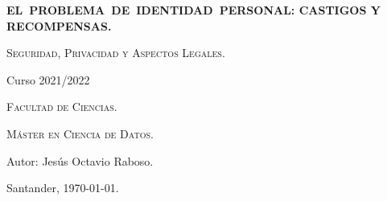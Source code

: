 \documentclass[main.tex]{subfiles}
\begin{document}
	\frontmatter
\begin{titlepage}

\centering
{\bfseries\Large \hbox{EL PROBLEMA DE IDENTIDAD PERSONAL:} CASTIGOS Y RECOMPENSAS.  \par}
\vspace{1cm}
{\scshape\large Seguridad, Privacidad y Aspectos Legales. \par}
\vspace{0.5cm}
{\large Curso 2021/2022 \par}
\vspace{0.5cm}
\vspace{0.25cm}
{\scshape\large Facultad de Ciencias. \par}
\vspace{0.25cm}
{\scshape\large Máster en Ciencia de Datos. \par}
\vspace{1cm}
{\large Autor: Jesús Octavio Raboso. \par}
\vspace{2cm}
\raggedleft
{\small Santander,  \today.} %

\end{titlepage}
\end{document}
